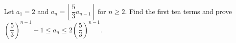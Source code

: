 Let $a_1=2$ and $a_n=\left\lfloor\dfrac{5}{3}a_{n-1}\right\rfloor$ for $n\ge2$. Find the first ten terms and prove $\left(\dfrac{5}{3}\right)^{n-1}+1\le a_n\le2\left(\dfrac{5}{3}\right)^{n-1}$.
